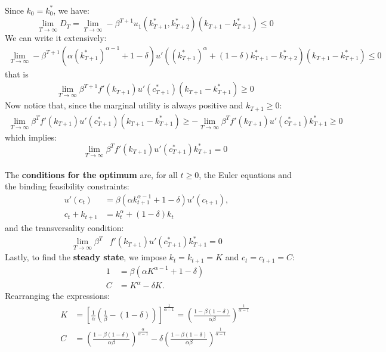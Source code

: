 \documentclass[dvipsnames,11pt]{article}
\begin{document}
\begin{solution}
\begin{align*}
\end{align*}
Since $k_0=k_0^*$, we have:
\begin{equation*}
    \lim_{T\to \infty}D_T=\lim_{T \to \infty }-\beta^{T+1} u_{1}(k_{T+1}^*,k_{T+2}^*)(k_{T+1}-k_{T+1}^*) \leq 0
\end{equation*}
We can write it extensively:
\begin{align*}
    \lim_{T \to \infty } -\beta^{T+1} (\alpha(k_{T+1}^*)^{\alpha-1}+1-\delta)u'((k_{T+1}^*)^{\alpha}+(1-\delta)k_{T+1}^*-k_{T+2}^*)(k_{T+1}-k_{T+1}^*)\leq 0
\end{align*}
that is
\begin{align*}
    \lim_{T \to \infty } \beta^{T+1} f'(k_{T+1})u'(c_{T+1}^*) (k_{T+1}-k_{T+1}^*)\geq 0
\end{align*}
Now notice that, since the marginal utility is always positive and $k_{T+1}\geq 0$:
\begin{align*}
    \lim_{T \to \infty } \beta^Tf'(k_{T+1})u'(c_{T+1}^*) (k_{T+1}-k_{T+1}^*)  \geq -\lim_{T \to \infty } \beta^Tf'(k_{T+1})u'(c_{T+1}^*)k_{T+1}^* \geq 0
\end{align*}
which implies:
\[
\lim_{T \to \infty } \beta^Tf'(k_{T+1})u'(c_{T+1}^*)k_{T+1}^*=0
\]
 \\
 The \textbf{conditions for the optimum} are, for all $t\geq 0$, the Euler equations and the binding feasibility constraints: 
 \begin{align*}
     u'(c_t)&=\beta (\alpha k_{t+1}^{\alpha-1}+1-\delta)u'(c_{t+1}), \qquad  \tag{EE}\\
     c_t + k_{t+1} &= k_t^\alpha + (1 - \delta) k_t \qquad \tag{FC}
 \end{align*}
 and the transversality condition:
 \begin{align*}
          \lim_{T \to \infty } \beta^T&f'(k_{T+1})u'(c_{T+1}^*)k_{T+1}^*=0 \qquad \tag{TVC}
 \end{align*}
 Lastly, to find the \textbf{steady state}, we impose $k_t=k_{t+1}=K$ and $c_t=c_{t+1}=C$:
 \begin{align*}
     1&=\beta (\alpha K^{\alpha-1}+1-\delta) \\
     C&=K^\alpha-\delta K.
 \end{align*}
 Rearranging the expressions:
 \begin{align*}
     K&= \left [ \frac{1}{\alpha}\left(\frac{1}{\beta}-(1-\delta)\right)\right]^{\frac{1}{\alpha-1}}=\left( \frac{1-\beta(1-\delta)}{\alpha \beta}\right)^{\frac{1}{\alpha-1}} \\
     C&=\left( \frac{1-\beta(1-\delta)}{\alpha \beta}\right)^{\frac{\alpha}{\alpha-1}}-\delta \left( \frac{1-\beta(1-\delta)}{\alpha \beta}\right)^{\frac{1}{\alpha-1}}
 \end{align*}
                \end{solution}
\end{document}
